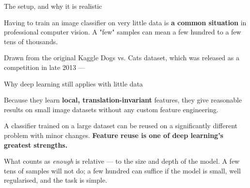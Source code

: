\documentclass[aspectratio=169,11pt,t]{beamer}
\begin{document}
\begin{frame}[shrink=25]{The setup, and why it is realistic}
{\fontsize{9.4}{12.6}\selectfont\color{fg2}Having to train an image classifier on very little data is \textbf{a common situation} in professional computer vision. A "few" samples can mean a few hundred to a few tens of thousands.\par}\vskip 4pt
\begin{minipage}[t]{0.3253\textwidth}
\end{minipage}%
\hfill
\begin{minipage}[t]{0.3253\textwidth}
\end{minipage}%
\hfill
\begin{minipage}[t]{0.3253\textwidth}
\end{minipage}%
{\fontsize{9.4}{12.6}\selectfont\color{fg2}Drawn from the original Kaggle Dogs vs. Cats dataset, which was released as a competition in late 2013 --- \par}\vskip 4pt
\end{frame}

\begin{frame}[shrink=25]{Why deep learning still applies with little data}
\begin{minipage}[t]{0.494\textwidth}
\begin{icardgood}
Because they learn \textbf{local, translation-invariant} features, they give reasonable results on small image datasets without any custom feature engineering.
\end{icardgood}
\end{minipage}%
\hfill
\begin{minipage}[t]{0.494\textwidth}
\begin{icardgood}
A classifier trained on a large dataset can be reused on a significantly different problem with minor changes. \textbf{Feature reuse is one of deep learning's greatest strengths.}
\end{icardgood}
\end{minipage}%
{\fontsize{9.4}{12.6}\selectfont\color{fg2}What counts as \textit{enough} is relative --- to the size and depth of the model. A few tens of samples will not do; a few hundred can suffice if the model is small, well regularised, and the task is simple.\par}\vskip 4pt
\end{frame}
\end{document}
